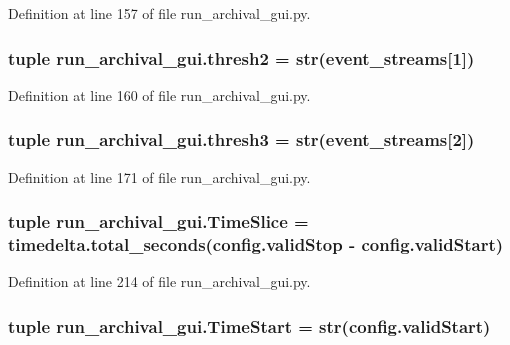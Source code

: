 Definition at line 157 of file run\-\_\-archival\-\_\-gui.\-py.

\hypertarget{namespacerun__archival__gui_a9c3d13b4619e84a8e7a69c1f8586a6bc}{
\subsubsection[{thresh2}]{\setlength{\rightskip}{0pt plus 5cm}tuple run\-\_\-archival\-\_\-gui.\-thresh2 = str({\bf event\-\_\-streams}\mbox{[}1\mbox{]})}}\label{namespacerun__archival__gui_a9c3d13b4619e84a8e7a69c1f8586a6bc}


Definition at line 160 of file run\-\_\-archival\-\_\-gui.\-py.

\hypertarget{namespacerun__archival__gui_a74997656480908b3c860d53d2b06c6b5}{
\subsubsection[{thresh3}]{\setlength{\rightskip}{0pt plus 5cm}tuple run\-\_\-archival\-\_\-gui.\-thresh3 = str({\bf event\-\_\-streams}\mbox{[}2\mbox{]})}}\label{namespacerun__archival__gui_a74997656480908b3c860d53d2b06c6b5}


Definition at line 171 of file run\-\_\-archival\-\_\-gui.\-py.

\hypertarget{namespacerun__archival__gui_acc1fabeb046529cb059968a74ee28886}{
\subsubsection[{Time\-Slice}]{\setlength{\rightskip}{0pt plus 5cm}tuple run\-\_\-archival\-\_\-gui.\-Time\-Slice = timedelta.\-total\-\_\-seconds(config.\-valid\-Stop -\/ config.\-valid\-Start)}}\label{namespacerun__archival__gui_acc1fabeb046529cb059968a74ee28886}


Definition at line 214 of file run\-\_\-archival\-\_\-gui.\-py.

\hypertarget{namespacerun__archival__gui_abae7c9a7fe9ae6b56c4ceab0757610a4}{
\subsubsection[{Time\-Start}]{\setlength{\rightskip}{0pt plus 5cm}tuple run\-\_\-archival\-\_\-gui.\-Time\-Start = str(config.\-valid\-Start)}}\label{namespacerun__archival__gui_abae7c9a7fe9ae6b56c4ceab0757610a4}


